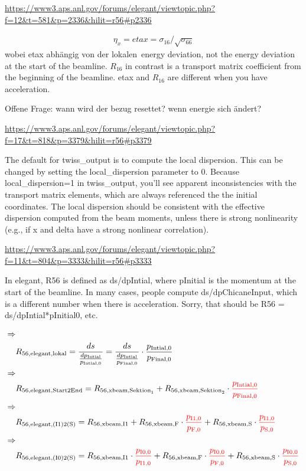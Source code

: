 \documentclass[12pt]{scrreprt}%
\begin{document}
 

\url{https://www3.aps.anl.gov/forums/elegant/viewtopic.php?f=12&t=581&p=2336&hilit=r56#p2336}

\begin{align*}
\eta_x =etax = \sigma_{16}/\sqrt{\sigma_{66}} 
\end{align*}
wobei etax abhängig von der \glqq lokalen\grqq~energy deviation, not the energy deviation at the start of the beamline. $R_{16}$ in contrast is a transport matrix coefficient from the beginning of the beamline. etax and $R_{16}$ are different when you have acceleration.

Offene Frage: wann wird der bezug resettet? wenn energie sich ändert?


\url{https://www3.aps.anl.gov/forums/elegant/viewtopic.php?f=17&t=818&p=3379&hilit=r56#p3379}

The default for twiss\_output is to compute the local dispersion. This can be changed by setting the local\_dispersion parameter to 0. Because local\_dispersion=1 in twiss\_output, you'll see apparent inconsistencies with the transport matrix elements, which are always referenced the the initial coordinates. The local dispersion should be consistent with the effective dispersion computed from the beam moments, unless there is strong nonlinearity (e.g., if x and delta have a strong nonlinear correlation).

\url{https://www3.aps.anl.gov/forums/elegant/viewtopic.php?f=11&t=804&p=3333&hilit=r56#p3333}

In elegant, R56 is defined as ds/dpIntial, where pInitial is the momentum at the start of the beamline. In many cases, people compute ds/dpChicaneInput, which is a different number when there is acceleration. Sorry, that should be R56 = ds/dpIntial*pInitial0, etc.

\begin{align*}
\Rightarrow&~\\
~& R_{56,\text{elegant,lokal}} = \frac{ds}{\frac{dp_\text{Intial}}{p_\text{Intial,0}}} = \frac{ds}{\frac{dp_\text{Intial}}{p_\text{Final,0}}} \cdot\frac{p_\text{Intial,0}}{p_\text{Final,0}}\\
\Rightarrow&~\\
~& R_{56,\text{elegant,Start2End}} = R_{56,\text{xbeam,Sektion}_1}+R_{56,\text{xbeam,Sektion}_2}\cdot{\color{red}\frac{p_\text{Intial,0}}{p_\text{Final,0}}}\\
\Rightarrow&~\\
~& R_{56,\text{elegant,(I1)2(S)}} = R_{56,\text{xbeam,I1}}+R_{56,\text{xbeam,F}}\cdot{\color{red}\frac{p_\text{I1,0}}{p_\text{F,0}}}+R_{56,\text{xbeam,S}}\cdot{\color{red}\frac{p_\text{I1,0}}{p_\text{S,0}}}\\
\Rightarrow&~\\
~& R_{56,\text{elegant,(I0)2(S)}} = R_{56,\text{xbeam,I1}}\cdot{\color{red}\frac{p_\text{I0,0}}{p_\text{I1,0}}}+R_{56,\text{xbeam,F}}\cdot{\color{red}\frac{p_\text{I0,0}}{p_\text{F,0}}}+R_{56,\text{xbeam,S}}\cdot{\color{red}\frac{p_\text{I0,0}}{p_\text{S,0}}}
\end{align*}
\end{document}
